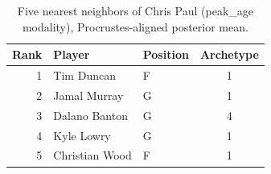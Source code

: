\begin{table}[htbp]
  \centering\small
  \begin{tabular}{rllc}
    \toprule
    Rank & Player & Position & Archetype \\
    \midrule
    1 & Tim Duncan & F & 1 \\
    2 & Jamal Murray & G & 1 \\
    3 & Dalano Banton & G & 4 \\
    4 & Kyle Lowry & G & 1 \\
    5 & Christian Wood & F & 1 \\
    \bottomrule
  \end{tabular}
  \caption{Five nearest neighbors of Chris Paul (peak_age modality), Procrustes-aligned posterior mean.}
  \label{tab:Chris_Paul_neighbors_peak_age}
\end{table}

